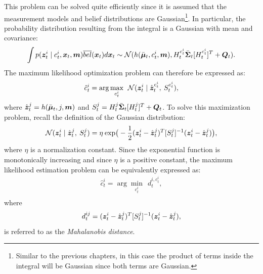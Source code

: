 This problem can be solved quite efficiently since it is assumed that the measurement models and belief distributions are Gaussian\footnote{Similar to the previous chapters, in this case the product of terms inside the integral will be Gaussian since both terms are Gaussian.}. In particular, the probability distribution resulting from the integral is a Gaussian with mean and covariance:
\begin{equation*}
\begin{split}
\int p(\bm{z}^i_{t}\mid c^i_{t},\bm{x}_t, \bm{m}) \overline{bel}(\bm{x}_t) d\bm{x}_t \sim \mathcal{N}(h(\bar{\bm{\mu}}_t, c_t^{i}, \bm{m}), H_t^{c_t^i} \bar{\bm{\Sigma}}_t [H_t^{c_t^i}]^T + \bm{Q}_t).
\end{split}
\end{equation*}
The maximum likelihood optimization problem can therefore be expressed as:
\begin{equation*}
\begin{split}
\hat{c}^i_{t} = \arg \max_{c^i_{t}} \:\:\mathcal{N}(\bm{z}_t^i \mid \hat{\bm{z}}^{c_t^i}_t,\: S_t^{c_t^i}), \\
\end{split}
\end{equation*}
where $\hat{\bm{z}}^{j}_t = h(\bar{\bm{\mu}}_t, j, \bm{m})$ and $S_t^j = H_t^{j} \bar{\bm{\Sigma}}_t [H_t^{j}]^T + \bm{Q}_t$.
To solve this maximization problem, recall the definition of the Gaussian distribution:
\begin{equation*}
\mathcal{N}(\bm{z}_t^i \mid \hat{\bm{z}}^{j}_t,\: S_t^{j}) = \eta\: \text{exp}\big( -\frac{1}{2}(\bm{z}_t^i-\hat{\bm{z}}^{j}_t)^T [S_t^{j}]^{-1} (\bm{z}_t^i-\hat{\bm{z}}^{j}_t) \big),
\end{equation*}
where $\eta$ is a normalization constant. Since the exponential function is monotonically increasing and since $\eta$ is a positive constant, the maximum likelihood estimation problem can be equivalently expressed as:
\begin{equation}
\begin{split}
\hat{c}^i_{t} = \arg \min_{c^i_{t}} \:\: d_t^{i,c^i_{t}}, \\
\end{split}
\end{equation}
where 
\begin{equation} \label{eq:mahalanobis}
d_t^{ij} = (\bm{z}_t^i-\hat{\bm{z}}^{j}_t)^T [S_t^{j}]^{-1} (\bm{z}_t^i-\hat{\bm{z}}^{j}_t),
\end{equation}
is referred to as the \textit{Mahalanobis distance}.

